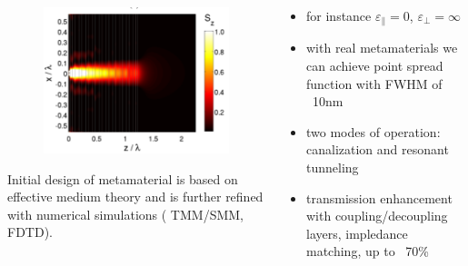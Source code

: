 \documentclass{beamer}
\begin{document}
\begin{frame}
	\begin{columns}
		\begin{column}{0.5\textwidth}
			\begin{figure}[htb]
				\includegraphics[width=\textwidth]{../images/multilayer/nondiffAMR.png}
			\end{figure}
		 	{\tiny Initial design of metamaterial is based on effective medium theory and is further refined with numerical simulations ( TMM/SMM, FDTD). }
		\end{column}
		 \begin{column}{0.5\textwidth}
			\begin{itemize}
				\item for instance $\varepsilon_{\parallel}=0$, $\varepsilon_{\perp}= \infty$ 
				\item with real metamaterials we can achieve point spread function with FWHM of ~10nm
				\item two modes of operation: canalization and resonant tunneling
				\item transmission enhancement with coupling/decoupling layers, impledance matching, up to ~70\%
			\end{itemize}
					
			
		\end{column}
	\end{columns}
\end{frame}
\end{document}
